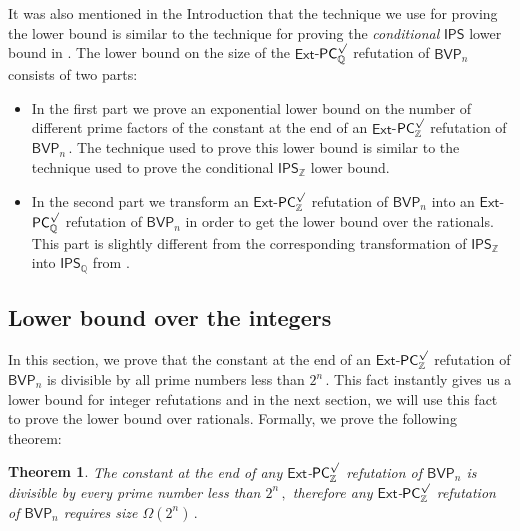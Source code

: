 \documentclass[11pt]{article}
\newtheorem{theorem}{Theorem}[section]
\newcommand{\Q}{{\mathbb Q}}
\newcommand{\Z}{{\mathbb Z}}
\begin{document}
It was also mentioned in the %
Introduction  %
 that the technique we use for proving the lower bound is similar to the technique for proving the \textit{conditional} $\mathsf{IPS}$ lower bound in \cite{AGHT19_new}. The lower bound on the size of the $\mathsf{Ext}$-$\mathsf{PC}^{\surd}_{\Q}$ refutation of $\mathsf{BVP}_n$ consists of two parts:
\begin{itemize}
\item In the first part we prove an exponential lower bound on the number of different prime factors of the constant at the end of an $\mathsf{Ext}$-$\mathsf{PC}^{\surd}_{\Z}$ refutation of %
$\mathsf{BVP}_n\,.$ %
 The technique used to prove this lower bound is similar to the technique used to prove the conditional $\mathsf{IPS}_\Z$ lower bound.
\item In the second part we transform an $\mathsf{Ext}$-$\mathsf{PC}^{\surd}_{\Z}$ refutation of $\mathsf{BVP}_n$ into  an $\mathsf{Ext}$-$\mathsf{PC}^{\surd}_{\Q}$ refutation of $\mathsf{BVP}_n$ in order to get the lower bound over the rationals. This part is slightly different from the corresponding transformation of $\mathsf{IPS}_\Z$ into $\mathsf{IPS}_\Q$ from  \cite{AGHT19_new}.
\end{itemize}




%
\subsection{Lower bound over the integers}  %
In this section, we prove that the constant at %
the end of an $\mathsf{Ext}$-$\mathsf{PC}^{\surd}_{\Z}$ refutation of $\mathsf{BVP}_n$ is divisible by all prime numbers less than %
$2^n\,.$ %
 This fact instantly gives us a lower bound for integer refutations and in the next section, we will use this fact to prove the lower bound over rationals. Formally, we prove the following theorem:
\begin{theorem}
\label{lower bound for integers depth-inf}
The constant at %
the end of any $\mathsf{Ext}$-$\mathsf{PC}^{\surd}_{\Z}$ refutation of $\mathsf{BVP}_n$ is divisible by every prime number less than %
$2^n\,,$ %
 therefore any $\mathsf{Ext}$-$\mathsf{PC}^{\surd}_{\Z}$ refutation of $\mathsf{BVP}_n$  requires size %
$\Omega(2^n)\,.$ %
\end{theorem}
\end{document}
